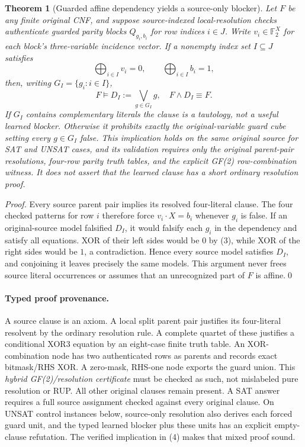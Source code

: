 \documentclass[11pt]{article}
\newtheorem{theorem}{Theorem}
\begin{document}
\begin{theorem}[Guarded affine dependency yields a source-only blocker]
Let $F$ be any finite original CNF, and suppose source-indexed local-resolution checks authenticate guarded parity blocks $Q_{g_i,b_i}$ for row indices $i\in J$. Write $v_i\in\mathbb F_2^X$ for each block's three-variable incidence vector. If a nonempty index set $I\subseteq J$ satisfies
\[
 \bigoplus_{i\in I}v_i=0,\qquad \bigoplus_{i\in I}b_i=1,
 \tag{3}
\]
then, writing $G_I=\{g_i:i\in I\}$,
\[
 \boxed{F\models D_I:=\bigvee_{g\in G_I}g,\quad F\wedge D_I\equiv F.}
 \tag{4}
\]
If $G_I$ contains complementary literals the clause is a tautology, not a useful learned blocker. Otherwise it prohibits exactly the original-variable guard cube setting every $g\in G_I$ false. This implication holds on the same original source for SAT and UNSAT cases, and its validation requires only the original parent-pair resolutions, four-row parity truth tables, and the explicit GF(2) row-combination witness. It does \emph{not} assert that the learned clause has a short ordinary resolution proof.
\end{theorem}
\begin{proof}
Every source parent pair implies its resolved four-literal clause. The four checked patterns for row $i$ therefore force $v_i\cdot X=b_i$ whenever $g_i$ is false. If an original-source model falsified $D_I$, it would falsify each $g_i$ in the dependency and satisfy all equations. XOR of their left sides would be $0$ by (3), while XOR of the right sides would be $1$, a contradiction. Hence every source model satisfies $D_I$, and conjoining it leaves precisely the same models. This argument never frees source literal occurrences or assumes that an unrecognized part of $F$ is affine.\qed
\end{proof}

\paragraph{Typed proof provenance.} A source clause is an axiom. A local split parent pair justifies its four-literal resolvent by the ordinary resolution rule. A complete quartet of these justifies a conditional XOR3 equation by an eight-case finite truth table. An XOR-combination node has two authenticated rows as parents and records exact bitmask/RHS XOR. A zero-mask, RHS-one node exports the guard union. This \emph{hybrid GF(2)/resolution certificate} must be checked as such, not mislabeled pure resolution or RUP. All other original clauses remain present. A SAT answer requires a full source assignment checked against every original clause. On UNSAT control instances below, source-only resolution also derives each forced guard unit, and the typed learned blocker plus these units has an explicit empty-clause refutation. The verified implication in (4) makes that mixed proof sound.
\end{document}
